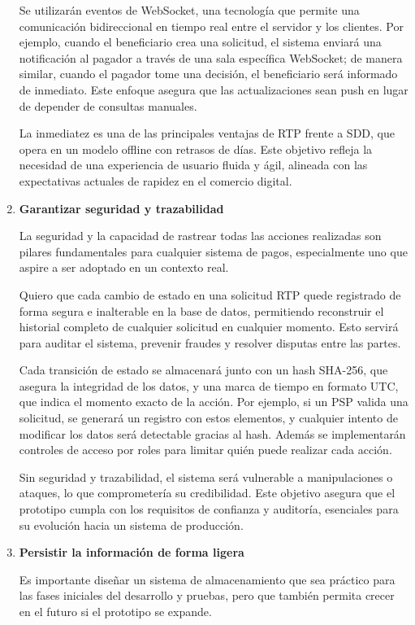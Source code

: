 \begin{enumerate}[label=\textbf{\arabic*}]
    Se utilizarán eventos de WebSocket, una tecnología que permite una comunicación bidireccional en tiempo real entre el servidor y los clientes. Por ejemplo, cuando el beneficiario crea una solicitud, el sistema enviará una notificación al pagador a través de una sala específica WebSocket; de manera similar, cuando el pagador tome una decisión, el beneficiario será informado de inmediato. Este enfoque asegura que las actualizaciones sean push en lugar de depender de consultas manuales.

    La inmediatez es una de las principales ventajas de RTP frente a SDD, que opera en un modelo offline con retrasos de días. Este objetivo refleja la necesidad de una experiencia de usuario fluida y ágil, alineada con las expectativas actuales de rapidez en el comercio digital.
  
  \item \textbf{Garantizar seguridad y trazabilidad}

    La seguridad y la capacidad de rastrear todas las acciones realizadas son pilares fundamentales para cualquier sistema de pagos, especialmente uno que aspire a ser adoptado en un contexto real.

    Quiero que cada cambio de estado en una solicitud RTP quede registrado de forma segura e inalterable en la base de datos, permitiendo reconstruir el historial completo de cualquier solicitud en cualquier momento. Esto servirá para auditar el sistema, prevenir fraudes y resolver disputas entre las partes.

    Cada transición de estado se almacenará junto con un hash SHA-256, que asegura la integridad de los datos, y una marca de tiempo en formato UTC, que indica el momento exacto de la acción. Por ejemplo, si un PSP valida una solicitud, se generará un registro con estos elementos, y cualquier intento de modificar los datos será detectable gracias al hash. Además se implementarán controles de acceso por roles para limitar quién puede realizar cada acción.

    Sin seguridad y trazabilidad, el sistema será vulnerable a manipulaciones o ataques, lo que comprometería su credibilidad. Este objetivo asegura que el prototipo cumpla con los requisitos de confianza y auditoría, esenciales para su evolución hacia un sistema de producción.
  
  \item \textbf{Persistir la información de forma ligera}

    Es importante diseñar un sistema de almacenamiento que sea práctico para las fases iniciales del desarrollo y pruebas, pero que también permita crecer en el futuro si el prototipo se expande.


\end{enumerate}
